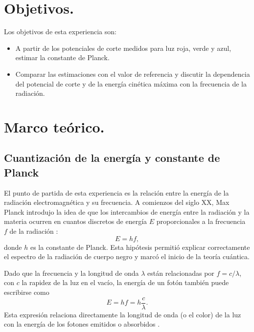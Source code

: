 \documentclass[11pt,twocolumn]{article}
\begin{document}
\section{Objetivos.}

Los objetivos de esta experiencia son:

\begin{itemize}[leftmargin=*, itemsep=2pt, before=\sloppy, after=\fussy]
  \item A partir de los potenciales de corte medidos para luz roja, verde y azul, estimar la constante de Planck.
  \item Comparar las estimaciones con el valor de referencia y discutir la dependencia del potencial de corte y de la energía cinética máxima con la frecuencia de la radiación.
\end{itemize}

\section{Marco teórico.}

\subsection{Cuantización de la energía y constante de Planck}

El punto de partida de esta experiencia es la relación entre la energía de la radiación electromagnética y su frecuencia. A comienzos del siglo XX, Max Planck introdujo la idea de que los intercambios de energía entre la radiación y la materia ocurren en cuantos discretos de energía $E$ proporcionales a la frecuencia $f$ de la radiación \cite{planck1900_blackbody}:
\begin{equation*}
    E = h f,
\end{equation*}
donde $h$ es la constante de Planck. Esta hipótesis permitió explicar correctamente el espectro de la radiación de cuerpo negro y marcó el inicio de la teoría cuántica.

Dado que la frecuencia y la longitud de onda $\lambda$ están relacionadas por $f = c/\lambda$, con $c$ la rapidez de la luz en el vacío, la energía de un fotón también puede escribirse como
\begin{equation*}
    E = h f = h \frac{c}{\lambda}.
\end{equation*}
Esta expresión relaciona directamente la longitud de onda (o el color) de la luz con la energía de los fotones emitidos o absorbidos \cite{quantum_mechanics_photoelectric}.
\end{document}
